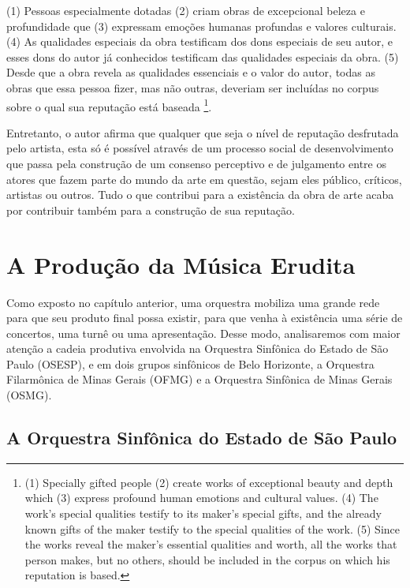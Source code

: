 \documentclass[a4paper, 12pt, openright, oneside, german, french, english, brazil]{abntex2}
\begin{document}
	\begin{citacao}
		(1) Pessoas especialmente dotadas (2) criam obras de excepcional beleza e profundidade que (3) expressam emoções humanas profundas e valores culturais. (4) As qualidades especiais da obra testificam dos dons especiais de seu autor, e esses dons do autor já conhecidos testificam das qualidades especiais da obra. (5) Desde que a obra revela as qualidades essenciais e o valor do autor, todas as obras que essa pessoa fizer, mas não outras, deveriam ser incluídas no corpus sobre o qual sua reputação está baseada \footnote{(1) Specially gifted people (2) create works of exceptional beauty and depth which (3) express profound human emotions and cultural values. (4) The work’s special qualities testify to its maker’s special gifts, and the already known gifts of the maker testify to the special qualities of the work. (5) Since the works reveal the maker’s essential qualities and worth, all the works that person makes, but no others, should be included in the corpus on which his reputation is based.}. \cite[p. 352-3]{becker2008art}
	\end{citacao}
	
	Entretanto, o autor afirma que qualquer que seja o nível de reputação desfrutada pelo artista, esta só é possível através de um processo social de desenvolvimento que passa pela construção de um consenso perceptivo e de julgamento entre os atores que fazem parte do mundo da arte em questão, sejam eles público, críticos, artistas ou outros. Tudo o que contribui para a existência da obra de arte acaba por contribuir também para a construção de sua reputação.
	
	
	
	\chapter{A Produção da Música Erudita}
	
	Como exposto no capítulo anterior, uma orquestra mobiliza uma grande rede para que seu produto final possa existir, para que venha à existência uma série de concertos, uma turnê ou uma apresentação. Desse modo, analisaremos com maior atenção a cadeia produtiva envolvida na Orquestra Sinfônica do Estado de São Paulo (OSESP), e em dois grupos sinfônicos de Belo Horizonte, a Orquestra Filarmônica de Minas Gerais (OFMG) e a Orquestra Sinfônica de Minas Gerais (OSMG).
	
	\section{A Orquestra Sinfônica do Estado de São Paulo}
	
\end{document}
